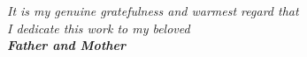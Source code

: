 \begin{center}
  
    \vspace*{\fill}
  \itshape {\large{It is my genuine gratefulness and warmest regard that \\I dedicate this work to my beloved} \\
 
 \Large{ \bfseries{Father and Mother}}}
    \vspace*{\fill}
\end{center}
\clearpage
